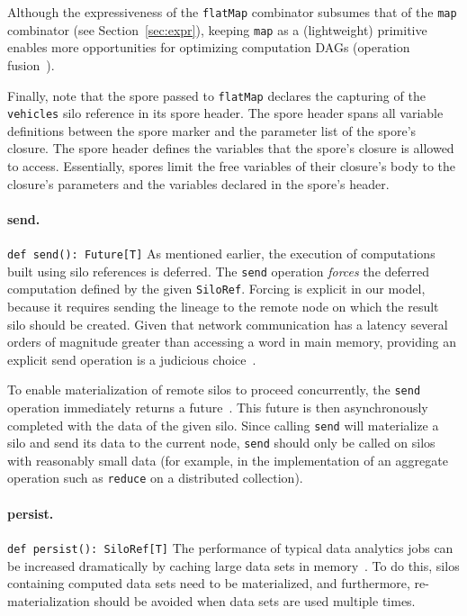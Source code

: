 \documentclass{jfp1}
\begin{document}
Although the expressiveness of the \verb|flatMap| combinator subsumes that of
the \verb|map| combinator (see Section~\ref{sec:expr}), keeping \verb|map| as a
(lightweight) primitive enables more opportunities for optimizing computation
DAGs (\eg operation fusion~\cite{FlumeJava}).

Finally, note that the spore passed to \verb|flatMap| declares the
capturing of the \verb|vehicles| silo reference in its spore
header. The spore header spans all variable definitions between the
spore marker and the parameter list of the spore's closure. The spore
header defines the variables that the spore's closure is allowed to
access. Essentially, spores limit the free variables of their
closure's body to the closure's parameters and the variables declared
in the spore's header.

\paragraph{send.}%
%
\texttt{def send(): Future[T]} \newline
%
As mentioned earlier, the execution of computations built using silo references
is deferred. The \verb|send| operation {\em forces} the deferred computation
defined by the given \verb|SiloRef|. Forcing is explicit in our model, because it
requires sending the lineage to the remote node on which the result silo should
be created. Given that network communication has a latency several orders of
magnitude greater than accessing a word in main memory, providing an explicit
send operation is a judicious choice~\cite{ANoteDistComp}.

To enable materialization of remote silos to proceed concurrently, the
\verb|send| operation immediately returns a future~\cite{Futures}. This future
is then asynchronously completed with the data of the given silo. Since calling
\verb|send| will materialize a silo and send its data to the current node,
\verb|send| should only be called on silos with reasonably small data (for
example, in the implementation of an aggregate operation such as \verb|reduce|
on a distributed collection).

\paragraph{persist.}%
%
\texttt{def persist(): SiloRef[T]} \newline
%
The performance of typical data analytics jobs can be increased
dramatically by caching large data sets in memory~\cite{Spark}. To do
this, silos containing computed data sets need to be materialized, and
furthermore, re-materialization should be avoided when data sets are
used multiple times.
\end{document}
